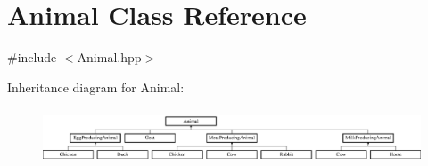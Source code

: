 \hypertarget{class_animal}{}\section{Animal Class Reference}
\label{class_animal}


{\ttfamily \#include $<$Animal.\+hpp$>$}

Inheritance diagram for Animal\+:\begin{figure}[H]
\begin{center}
\leavevmode
\includegraphics[height=1.666667cm]{class_animal}
\end{center}
\end{figure}
